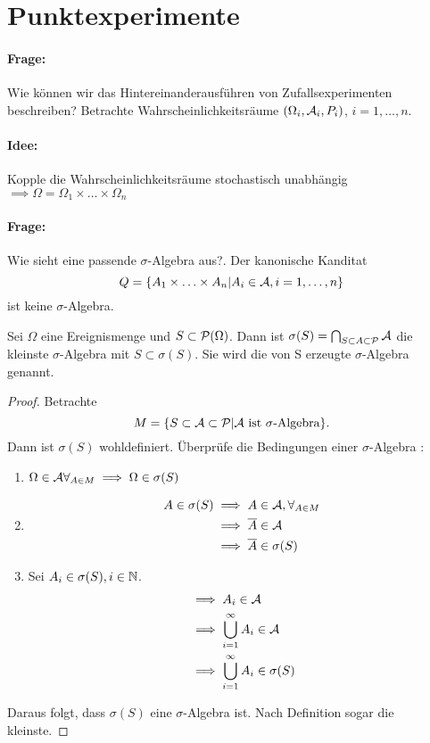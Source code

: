 \section{Punktexperimente}
\paragraph{Frage:}
Wie können wir das Hintereinanderausführen von Zufallsexperimenten beschreiben? Betrachte Wahrscheinlichkeitsräume $(\Omega_i,\mathcal{A}_i,P_i)$, $i=1,\ldots,n$.

\paragraph{Idee:}
Kopple die Wahrscheinlichkeitsräume stochastisch unabhängig $\implies \Omega = \Omega_1 \times \ldots\times \Omega_n$ 
\paragraph{Frage:}
Wie sieht eine passende $\sigma$-Algebra aus?. Der kanonische Kanditat \[
    Q = \{A_1\times \ldots \times A_n | A_i \in \mathcal{A}, i=1,\ldots,n\}
\]  
ist keine $\sigma$-Algebra. 

\begin{theorem}
    Sei $\Omega$ eine Ereignismenge und $S \subset \mathcal{P}(\Omega)$. Dann ist $\sigma(S)= \bigcap_{S \subset A \subset \mathcal{P}}\mathcal{A}$ die kleinste $\sigma$-Algebra mit $S \subset \sigma(S)$. Sie wird die von S erzeugte $\sigma$-Algebra genannt.     
\end{theorem}
\begin{proof}
Betrachte \[
    M=\{S \subset \mathcal{A} \subset \mathcal{P} | \mathcal{A} \text{ ist  } \sigma \text{-Algebra}\} 
.\] 
Dann ist $\sigma(S)$ wohldefiniert.
Überprüfe die Bedingungen einer $\sigma$-Algebra :
\begin{enumerate}
    \item $\Omega \in \mathcal{A} \forall_{A \in M} \implies \Omega \in  \sigma(S)$ 
    \item \begin{align*}
        A \in \sigma(S) &\implies A \in \mathcal{A}, \forall_{A \in M} \\
                        &\implies \overline{A}\in \mathcal{A} \\
        &\implies \overline{A}\in \sigma(S)
    \end{align*}
\item Sei $A_i \in \sigma(S), i \in \mathbb{N}$.
    \begin{align*}
        &\implies A_i \in \mathcal{A} \\
        &\implies \bigcup_{i=1}^{\infty} A_i \in \mathcal{A} \\
        &\implies \bigcup_{i=1}^{\infty} A_i \in \sigma(S)
    \end{align*}
\end{enumerate}
Daraus folgt, dass $\sigma(S)$ eine $\sigma$-Algebra ist. Nach Definition sogar die kleinste. 
\end{proof}



